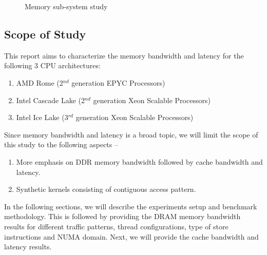 \documentclass{article}
\begin{document}
\begin{figure}
\centering
{}
\caption{Memory sub-system study} \label{figure:1}
\end{figure}

\subsection{Scope of Study}
This report aims to characterize the memory bandwidth and latency for the following 3 CPU architectures:
\begin{enumerate}
    \item AMD Rome (2$^{nd}$ generation EPYC Processors)
    \item Intel Cascade Lake (2$^{nd}$  generation Xeon Scalable Processors)
    \item Intel Ice Lake (3$^{rd}$  generation Xeon Scalable Processors)
\end{enumerate}
Since memory bandwidth and latency is a broad topic, we will limit the scope of this study to the following aspects --
\begin{enumerate}
\item More emphasis on DDR memory bandwidth followed by cache bandwidth and latency.
\item Synthetic kernels consisting of contiguous access pattern.
\end{enumerate}

In the following sections, we will describe the experiments setup and benchmark methodology. This is followed by providing the DRAM memory bandwidth results for different traffic patterns, thread configurations, type of store instructions and NUMA domain. Next, we will provide the cache bandwidth and latency results. 
\end{document}

